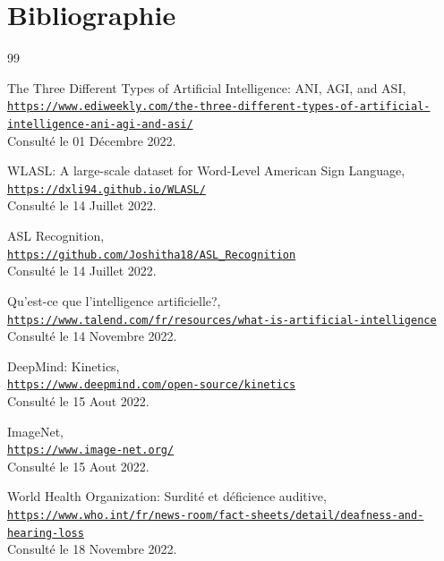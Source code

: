 \chapter*{Bibliographie}

\begin{thebibliography}{99}

The Three Different Types of Artificial Intelligence: ANI, AGI, and ASI,
\\\texttt{\href{https://www.ediweekly.com/the-three-different-types-of-artificial-intelligence-ani-agi-and-asi/}{https://www.ediweekly.com/the-three-different-types-of-artificial-intelligence-ani-agi-and-asi/}}
\\ Consulté le 01 Décembre 2022.

WLASL: A large-scale dataset for Word-Level American Sign Language,
\\\texttt{\href{https://dxli94.github.io/WLASL/}{https://dxli94.github.io/WLASL/}}
\\ Consulté le 14 Juillet 2022.

ASL Recognition,
\\\texttt{\href{https://github.com/Joshitha18/ASL_Recognition}{https://github.com/Joshitha18/ASL\_Recognition}}
\\ Consulté le 14 Juillet 2022.

Qu'est-ce que l'intelligence artificielle?,
\\\texttt{\href{https://www.talend.com/fr/resources/what-is-artificial-intelligence}{https://www.talend.com/fr/resources/what-is-artificial-intelligence}}
\\ Consulté le 14 Novembre 2022.

DeepMind: Kinetics,
\\\texttt{\href{https://www.deepmind.com/open-source/kinetics}{https://www.deepmind.com/open-source/kinetics}}
\\ Consulté le 15 Aout 2022.

ImageNet,
\\\texttt{\href{https://www.image-net.org/}{https://www.image-net.org/}}
\\ Consulté le 15 Aout 2022.

World Health Organization: Surdité et déficience auditive,
\\\texttt{\href{https://www.who.int/fr/news-room/fact-sheets/detail/deafness-and-hearing-loss}{https://www.who.int/fr/news-room/fact-sheets/detail/deafness-and-hearing-loss}}
\\ Consulté le 18 Novembre 2022.


\end{thebibliography}
